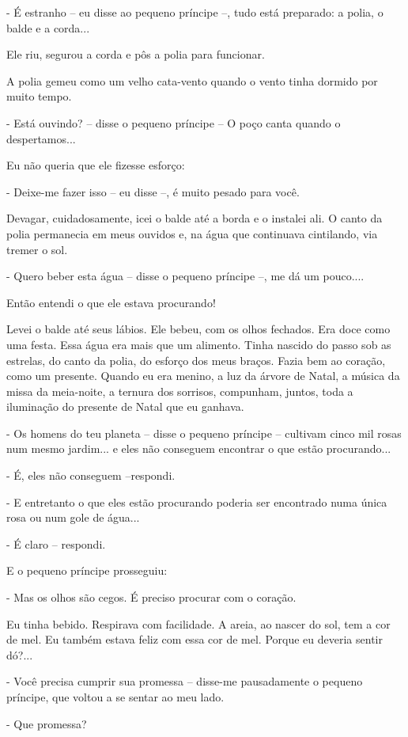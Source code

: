 - É estranho -- eu disse ao pequeno príncipe --, tudo está preparado: a
polia, o balde e a corda...

Ele riu, segurou a corda e pôs a polia para funcionar.

A polia gemeu como um velho cata-vento quando o vento tinha dormido por
muito tempo.

- Está ouvindo? -- disse o pequeno príncipe -- O poço canta quando o
despertamos...

Eu não queria que ele fizesse esforço:

- Deixe-me fazer isso -- eu disse --, é muito pesado para você.

Devagar, cuidadosamente, icei o balde até a borda e o instalei ali. O
canto da polia permanecia em meus ouvidos e, na água que continuava
cintilando, via tremer o sol.

- Quero beber esta água -- disse o pequeno príncipe --, me dá um
pouco....

Então entendi o que ele estava procurando!

Levei o balde até seus lábios. Ele bebeu, com os olhos fechados. Era
doce como uma festa. Essa água era mais que um alimento. Tinha nascido
do passo sob as estrelas, do canto da polia, do esforço dos meus braços.
Fazia bem ao coração, como um presente. Quando eu era menino, a luz da
árvore de Natal, a música da missa da meia-noite, a ternura dos
sorrisos, compunham, juntos, toda a iluminação do presente de Natal que
eu ganhava.

- Os homens do teu planeta -- disse o pequeno príncipe -- cultivam cinco
mil rosas num mesmo jardim... e eles não conseguem encontrar o que estão
procurando...

- É, eles não conseguem --respondi.

- E entretanto o que eles estão procurando poderia ser encontrado numa
única rosa ou num gole de água...

- É claro -- respondi.

E o pequeno príncipe prosseguiu:

- Mas os olhos são cegos. É preciso procurar com o coração.

Eu tinha bebido. Respirava com facilidade. A areia, ao nascer do sol,
tem a cor de mel. Eu também estava feliz com essa cor de mel. Porque eu
deveria sentir dó?...

- Você precisa cumprir sua promessa -- disse-me pausadamente o pequeno
príncipe, que voltou a se sentar ao meu lado.

- Que promessa?

